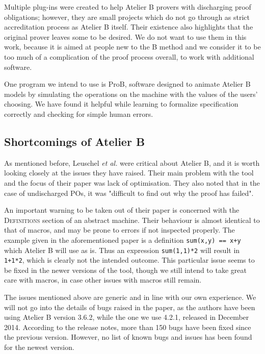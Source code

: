 \documentclass[12pt,journal,duplex]{IEEEtran}
\begin{document}
	Multiple plug-ins were created to help Atelier B provers with discharging proof obligations; however, they are small projects which do not go through as strict accreditation process as Atelier B itself. Their existence also highlights that the original prover leaves some to be desired. We do not want to use them in this work, because it is aimed at people new to the B method and we consider it to be too much of a complication of the proof process overall, to work with additional software.\cite{SMT}\cite{BEval}\cite{BWare}

	One program we intend to use is ProB, software designed to animate Atelier B models by simulating the operations on the machine with the values of the users' choosing. We have found it helpful while learning to formalize specification correctly and checking for simple human errors.\cite{proB}
	\subsection{Shortcomings of Atelier B}

	As mentioned before, Leuschel \emph{et al.} were critical about Atelier B, and it is worth looking closely at the issues they have raised. Their main problem with the tool and the focus of their paper was lack of optimisation. They also noted that in the case of undischarged POs, it was "difficult to find out why the proof has failed".

	An important warning to be taken out of their paper is concerned with the \textsc{Definitions} section of an abstract machine. Their behaviour is almost identical to that of macros, and may be prone to errors if not inspected properly. The example given in the aforementioned paper is a definition \texttt{sum(x,y) == x+y} which Atelier B will use as is. Thus an expression \texttt{sum(1,1)*2} will result in \texttt{1+1*2}, which is clearly not the intended outcome. This particular issue seems to be fixed in the newer versions of the tool, though we still intend to take great care with macros, in case other issues with macros still remain.

	The issues mentioned above are generic and in line with our own experience. We will not go into the details of bugs raised in the paper, as the authors have been using Atelier B version 3.6.2, while the one we use 4.2.1, released in December 2014. According to the release notes, more than 150 bugs have been fixed since the previous version. However, no list of known bugs and issues has been found for the newest version\cite{release notes}.
\end{document}
